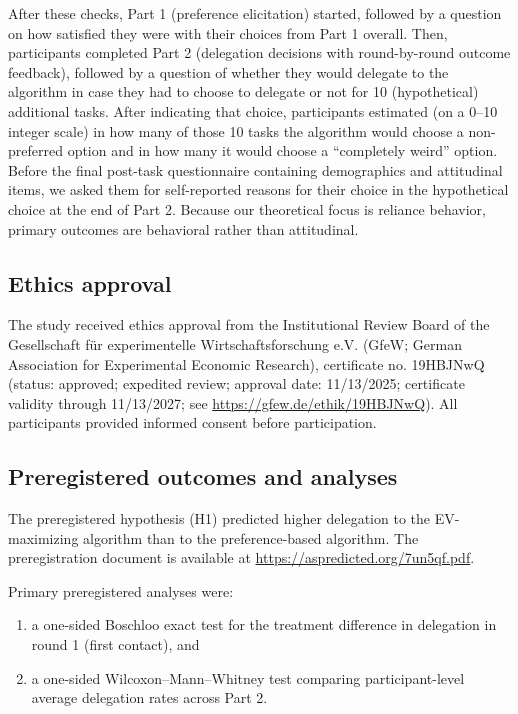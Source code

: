 \documentclass[a4paper, 12pt, fleqn]{article}
\theoremstyle{definition}
\begin{document}
After these checks, Part 1 (preference elicitation) started, followed by a question on how satisfied they were with their choices from Part 1 overall. Then, participants completed Part 2 (delegation decisions with round-by-round outcome feedback), followed by a question of whether they would delegate to the algorithm in case they had to choose to delegate or not for 10 (hypothetical) additional tasks. After indicating that choice, participants estimated (on a 0--10 integer scale) in how many of those 10 tasks the algorithm would choose a non-preferred option and in how many it would choose a ``completely weird'' option. Before the final post-task questionnaire containing demographics and attitudinal items, we asked them for self-reported reasons for their choice in the hypothetical choice at the end of Part 2. Because our theoretical focus is reliance behavior, primary outcomes are behavioral rather than attitudinal.

\subsection{Ethics approval}
The study received ethics approval from the Institutional Review Board of the Gesellschaft für experimentelle Wirtschaftsforschung e.V. (GfeW; German Association for Experimental Economic Research), certificate no. 19HBJNwQ (status: approved; expedited review; approval date: 11/13/2025; certificate validity through 11/13/2027; see {\footnotesize\url{https://gfew.de/ethik/19HBJNwQ}}). All participants provided informed consent before participation.

\subsection{Preregistered outcomes and analyses}
The preregistered hypothesis (H1) predicted higher delegation to the EV-maximizing algorithm than to the preference-based algorithm.
The preregistration document is available at {\footnotesize\url{https://aspredicted.org/7un5qf.pdf}}.

Primary preregistered analyses were:
\begin{enumerate}
  \item a one-sided Boschloo exact test for the treatment difference in delegation in round 1 (first contact), and
  \item a one-sided Wilcoxon--Mann--Whitney test comparing participant-level average delegation rates across Part 2.
\end{enumerate}
\end{document}
